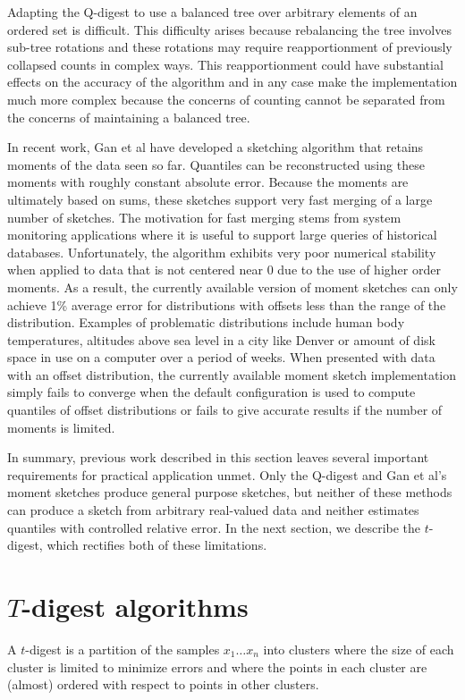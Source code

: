 \documentclass{vldb}
\begin{document}
Adapting the Q-digest to use a balanced tree over arbitrary elements of an ordered set is difficult.  This difficulty arises because rebalancing the tree involves sub-tree rotations and these rotations may require reapportionment of previously collapsed counts in complex ways.  This reapportionment could have substantial effects on the accuracy of the algorithm and in any case make the implementation much more complex because the concerns of counting cannot be separated from the concerns of maintaining a balanced tree.  

In recent work, Gan et al \cite{Gan:2018:MQS:3236187.3269475} have developed a sketching algorithm that retains moments of the data seen so far. Quantiles can be reconstructed using these moments with roughly constant absolute error. Because the moments are ultimately based on sums, these sketches support very fast merging of a large number of sketches. The motivation for fast merging stems from system monitoring applications where it is useful to support large queries of historical databases. Unfortunately, the algorithm exhibits very poor numerical stability when applied to data that is not centered near $0$ due to the use of higher order moments. As a result, the currently available version of moment sketches can only achieve 1\% average error for distributions with offsets less than the range of the distribution. Examples of problematic distributions include human body temperatures, altitudes above sea level in a city like Denver or amount of disk space in use on a computer over a period of weeks. When presented with data with an offset distribution, the currently available moment sketch implementation simply fails to converge when the default configuration is used to compute quantiles of offset distributions or fails to give accurate results if the number of moments is limited.

In summary, previous work described in this section leaves several important requirements for practical application unmet. Only the Q-digest and Gan et al's moment sketches produce general purpose sketches, but neither of these methods can produce a sketch from arbitrary real-valued data and neither estimates quantiles with controlled relative error. In the next section, we describe the $t$-digest, which rectifies both of these limitations.

\section{ $T$-digest algorithms}
A $t$-digest is a partition of the samples $x_1 \ldots x_n$ into clusters where the size of each cluster is limited to minimize errors and where the points in each cluster are (almost) ordered with respect to points in other clusters. 
\end{document}

